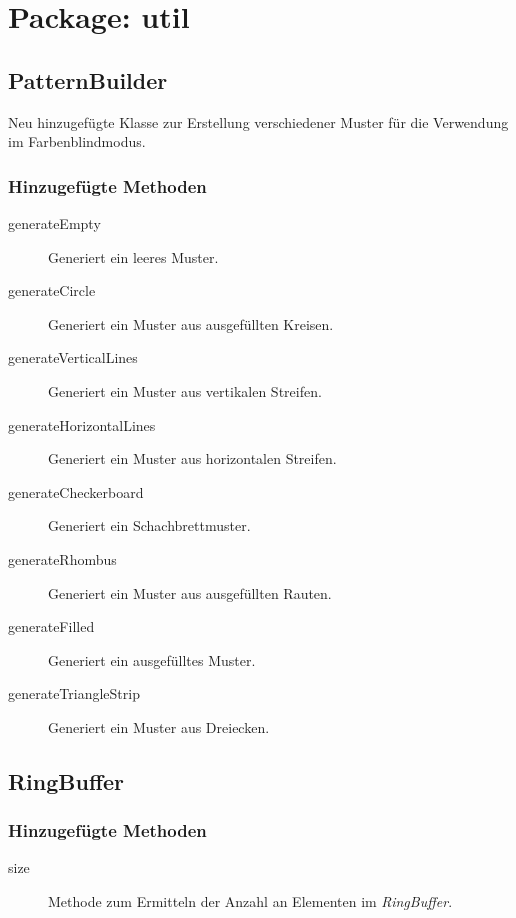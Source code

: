 \section{Package: util}

\subsection{PatternBuilder}
Neu hinzugefügte Klasse zur Erstellung verschiedener Muster für die Verwendung im Farbenblindmodus.

\subsubsection{Hinzugefügte Methoden}
\begin{description}
\item[generateEmpty]
Generiert ein leeres Muster.

\item[generateCircle]
Generiert ein Muster aus ausgefüllten Kreisen.

\item[generateVerticalLines]
Generiert ein Muster aus vertikalen Streifen.

\item[generateHorizontalLines]
Generiert ein Muster aus horizontalen Streifen.

\item[generateCheckerboard]
Generiert ein Schachbrettmuster.

\item[generateRhombus]
Generiert ein Muster aus ausgefüllten Rauten.

\item[generateFilled]
Generiert ein ausgefülltes Muster.

\item[generateTriangleStrip]
Generiert ein Muster aus Dreiecken.

\end{description}


\subsection{RingBuffer}

\subsubsection{Hinzugefügte Methoden}
\begin{description}
\item[size]
Methode zum Ermitteln der Anzahl an Elementen im \emph{RingBuffer}.
\end{description}
